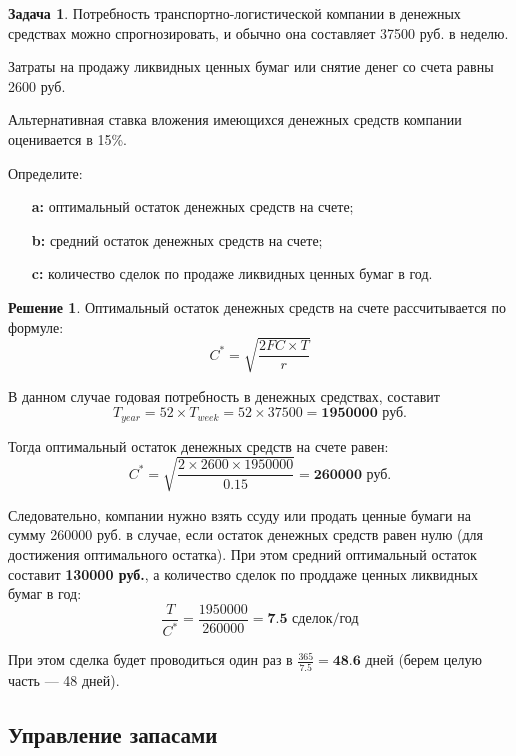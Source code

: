 \documentclass[a4paper, 14pt]{article}
\theoremstyle{plain} %
\theoremstyle{definition} %
\newtheorem*{solution}{Решение}
\newtheorem{problem}{Задача}[subsection]
\theoremstyle{remark} %
\begin{document}
\begin{problem}
	Потребность  транспортно-логистической  компании  в  денежных  средствах можно спрогнозировать, и обычно она составляет 37500 руб. в неделю.

	Затраты на продажу ликвидных ценных бумаг или снятие денег со счета равны 2600 руб.

	Альтернативная ставка вложения имеющихся денежных средств компании оценивается в 15\%.

	Определите:
	\begin{itemize}
		\item[\textbf{a:}] оптимальный остаток денежных средств на счете;
		\item[\textbf{b:}] средний остаток денежных средств на счете;
		\item[\textbf{c:}] количество сделок по продаже ликвидных ценных бумаг в год.
	\end{itemize}
	\begin{solution}
		Оптимальный остаток денежных средств на счете рассчитывается по формуле:
		\[C^{*} = \sqrt{\frac{2FC\times T}{r}}\]

		В данном случае годовая потребность в денежных средствах, составит
		\[T_{year} = 52\times T_{week} = 52 \times 37500 = \textbf{1950000 руб.}\]

		Тогда оптимальный остаток денежных средств на счете равен:
		\[C^{*} = \sqrt{\frac{2\times 2600\times 1950000}{0.15}} = \textbf{260000 руб.}\]

		Следовательно, компании нужно взять ссуду или продать ценные бумаги на сумму 260000 руб. в случае, если остаток денежных средств равен нулю (для достижения оптимального остатка). При этом средний оптимальный остаток составит \textbf{130000 руб.}, а количество сделок по проддаже ценных ликвидных бумаг в год:
		\[\frac{T}{C^{*}} = \frac{1950000}{260000} = \textbf{7.5 сделок/год}\]

		При этом сделка будет проводиться один раз в $\frac{365}{7.5} = \textbf{48.6 дней}$ (берем целую часть --- 48 дней).
	\end{solution}
\end{problem}

\subsection{Управление запасами}
\end{document}
